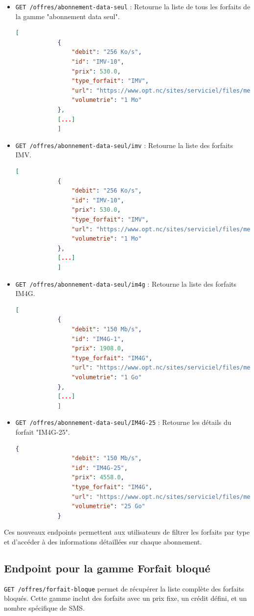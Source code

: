\documentclass{article}
\begin{document}
	\begin{itemize}
		\item \texttt{GET /offres/abonnement-data-seul} : Retourne la liste de tous les forfaits de la gamme "abonnement data seul".
		\begin{lstlisting}[language=JSON]
			[
			{
				"debit": "256 Ko/s",
				"id": "IMV-10",
				"prix": 530.0,
				"type_forfait": "IMV",
				"url": "https://www.opt.nc/sites/serviciel/files/media/file/FI_Internet%20Mobile%20au%20Volume.pdf",
				"volumetrie": "1 Mo"
			},
			[...]
			]
		\end{lstlisting}
		
		\item \texttt{GET /offres/abonnement-data-seul/imv} : Retourne la liste des forfaits IMV.
		\begin{lstlisting}[language=JSON]
			[
			{
				"debit": "256 Ko/s",
				"id": "IMV-10",
				"prix": 530.0,
				"type_forfait": "IMV",
				"url": "https://www.opt.nc/sites/serviciel/files/media/file/FI_Internet%20Mobile%20au%20Volume.pdf",
				"volumetrie": "1 Mo"
			},
			[...]
			]
		\end{lstlisting}
		
		\item \texttt{GET /offres/abonnement-data-seul/im4g} : Retourne la liste des forfaits IM4G.
		\begin{lstlisting}[language=JSON]
			[
			{
				"debit": "150 Mb/s",
				"id": "IM4G-1",
				"prix": 1908.0,
				"type_forfait": "IM4G",
				"url": "https://www.opt.nc/sites/serviciel/files/media/file/FI_ForfaitInternetMobile4G%202022_1.pdf",
				"volumetrie": "1 Go"
			},
			[...]
			]
		\end{lstlisting}
		
		\item \texttt{GET /offres/abonnement-data-seul/IM4G-25} : Retourne les détails du forfait "IM4G-25".
		\begin{lstlisting}[language=JSON]
			{
				"debit": "150 Mb/s",
				"id": "IM4G-25",
				"prix": 4558.0,
				"type_forfait": "IM4G",
				"url": "https://www.opt.nc/sites/serviciel/files/media/file/FI_ForfaitInternetMobile4G%202022_1.pdf",
				"volumetrie": "25 Go"
			}
		\end{lstlisting}
	\end{itemize}
	Ces nouveaux endpoints permettent aux utilisateurs de filtrer les forfaits par type et d'accéder à des informations détaillées sur chaque abonnement.
	
	\subsection{Endpoint pour la gamme Forfait bloqué}
	\texttt{GET /offres/forfait-bloque} permet de récupérer la liste complète des forfaits bloqués. Cette gamme inclut des forfaits avec un prix fixe, un crédit défini, et un nombre spécifique de SMS.
	
\end{document}
